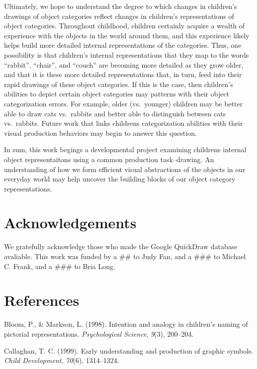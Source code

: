\documentclass[10pt, letterpaper]{article}
\begin{document}
Ultimately, we hope to understand the degree to which changes in
children's drawings of object categories reflect changes in children's
representations of object categories. Throughout childhood, children
certainly acquire a wealth of experience with the objects in the world
around them, and this experience likely helps build more detailed
internal representations of the categories. Thus, one possibility is
that children's internal representations that they map to the words
``rabbit'', ``chair'', and ``couch'' are becoming more detailed as they
grow older, and that it is these more detailed representations that, in
turn, feed into their rapid drawings of these object categories. If this
is the case, then children's abilities to depict certain object
categories may patterns with their object categorization errors. For
example, older (vs.~younger) children may be better able to draw cats
vs.~rabbits and better able to distinguish between cats vs.~rabbits.
Future work that links childrens categorization abilities with their
visual production behaviors may begin to answer this question.

In sum, this work begings a developmental project examining childrens
internal object representaitons using a common production task--drawing.
An understanding of how we form efficient visual abstractions of the
objects in our everyday world may help uncover the building blocks of
our object category representations.

\section{Acknowledgements}\label{acknowledgements}

We gratefully acknowledge those who made the Google QuickDraw database
avaliable. This work was funded by a \#\# to Judy Fan, and a \#\#\# to
Michael C. Frank, and a \#\#\# to Bria Long.

\section{References}\label{references}

\setlength{\parindent}{-0.1in} \setlength{\leftskip}{0.125in} \noindent

\hypertarget{refs}{}
\hypertarget{ref-bloom1998intention}{}
Bloom, P., \& Markson, L. (1998). Intention and analogy in children's
naming of pictorial representations. \emph{Psychological Science},
\emph{9}(3), 200--204.

\hypertarget{ref-callaghan1999early}{}
Callaghan, T. C. (1999). Early understanding and production of graphic
symbols. \emph{Child Development}, \emph{70}(6), 1314--1324.
\end{document}
